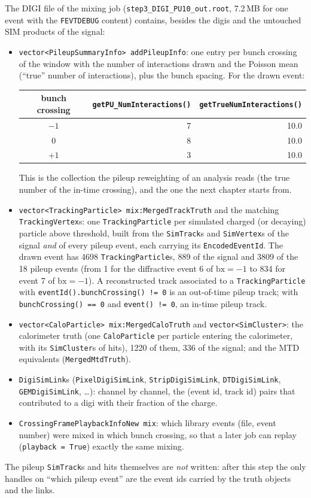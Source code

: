 \documentclass[11pt,a4paper]{article}
\newcommand{\code}[1]{\texttt{#1}}
\newcommand{\bx}{\ensuremath{\mathrm{bx}}}
\begin{document}
The DIGI file of the mixing job (\code{step3\_DIGI\_PU10\_out.root}, 7.2\,MB for one event with the
\code{FEVTDEBUG} content) contains, besides the digis and the untouched SIM products of the signal:
\begin{itemize}
\item \code{vector<PileupSummaryInfo> addPileupInfo}: one entry per bunch crossing of the window with the
  number of interactions drawn and the Poisson mean (``true'' number of interactions), plus the bunch
  spacing. For the drawn event:
  \begin{center}\small
  \begin{tabular}{crr}
  \toprule
  bunch crossing & \code{getPU\_NumInteractions()} & \code{getTrueNumInteractions()} \\
  \midrule
  $-1$ & 7 & 10.0 \\
  $0$  & 8 & 10.0 \\
  $+1$ & 3 & 10.0 \\
  \bottomrule
  \end{tabular}
  \end{center}
  This is the collection the pileup reweighting of an analysis reads (the true number of the in-time
  crossing), and the one the next chapter starts from.
\item \code{vector<TrackingParticle> mix:MergedTrackTruth} and the matching \code{TrackingVertex}s: one
  \code{TrackingParticle} per simulated charged (or decaying) particle above threshold, built from the
  \code{SimTrack}s and \code{SimVertex}s of the signal \emph{and} of every pileup event, each carrying its
  \code{EncodedEventId}. The drawn event has 4698 \code{TrackingParticle}s, 889 of the signal and 3809 of the
  18 pileup events (from 1 for the diffractive event 6 of $\bx=-1$ to 834 for event 7 of $\bx=-1$). A
  reconstructed track associated to a \code{TrackingParticle} with \code{eventId().bunchCrossing() != 0}
  is an out-of-time pileup track; with \code{bunchCrossing() == 0} and \code{event() != 0}, an in-time
  pileup track.
\item \code{vector<CaloParticle> mix:MergedCaloTruth} and \code{vector<SimCluster>}: the calorimeter truth
  (one \code{CaloParticle} per particle entering the calorimeter, with its \code{SimCluster}s of hits), 1220
  of them, 336 of the signal; and the MTD equivalents (\code{MergedMtdTruth}).
\item \code{DigiSimLink}s (\code{PixelDigiSimLink}, \code{StripDigiSimLink}, \code{DTDigiSimLink},
  \code{GEMDigiSimLink}, \ldots): channel by channel, the (event id, track id) pairs that contributed to a
  digi with their fraction of the charge.
\item \code{CrossingFramePlaybackInfoNew mix}: which library events (file, event number) were mixed in which
  bunch crossing, so that a later job can replay (\code{playback = True}) exactly the same mixing.
\end{itemize}
The pileup \code{SimTrack}s and hits themselves are \emph{not} written: after this step the only handles on
``which pileup event'' are the event ids carried by the truth objects and the links.
\end{document}
